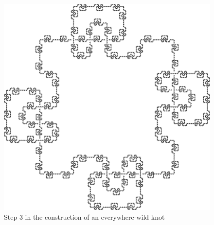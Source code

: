 \begin{figure}[H]
  \centering
  \includegraphics[scale=.5]{figures/infinite-gauss-sequence/test/test-2.pdf}
  \caption{Step 3 in the construction of an everywhere-wild knot}
  \label{fig:everywhere-wild-3}
\end{figure}







